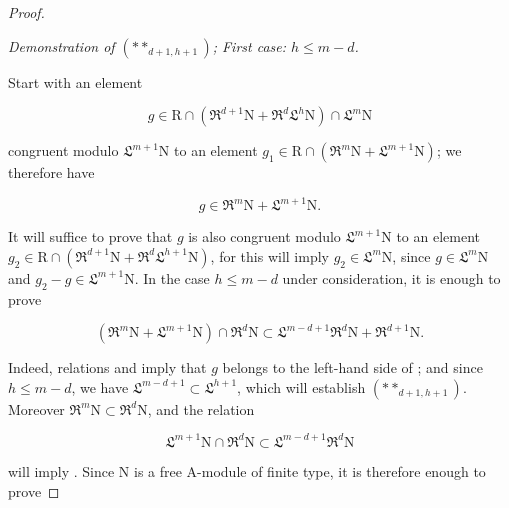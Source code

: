 \begin{proof}
\begin{env}[19.7.1.8]
\label{IV.19.7.1.8}
\emph{Demonstration of $(**_{d+1,h+1})$; First case: $h\leqslant m-d$.}

Start with an element
\end{env}
\begin{env}[19.7.1.9]
\label{IV.19.7.1.9}
\[
  g\in\mathrm{R}\cap(\mathfrak{R}^{d+1}\mathrm{N}+\mathfrak{R}^d\mathfrak{L}^h\mathrm{N})\cap\mathfrak{L}^m\mathrm{N}
\]
\end{env}

congruent modulo $\mathfrak{L}^{m+1}\mathrm{N}$ to an element $g_1\in\mathrm{R}\cap(\mathfrak{R}^m\mathrm{N}+\mathfrak{L}^{m+1}\mathrm{N})$; we therefore have

\begin{env}[19.7.1.10]
\label{IV.19.7.1.10}
\[
  g\in\mathfrak{R}^m\mathrm{N}+\mathfrak{L}^{m+1}\mathrm{N}.
\]
\end{env}

It will suffice to prove that $g$ is also congruent modulo $\mathfrak{L}^{m+1}\mathrm{N}$ to an element $g_2\in\mathrm{R}\cap(\mathfrak{R}^{d+1}\mathrm{N}+\mathfrak{R}^d\mathfrak{L}^{h+1}\mathrm{N})$, for this will imply $g_2\in\mathfrak{L}^m\mathrm{N}$, since $g\in\mathfrak{L}^m\mathrm{N}$ and $g_2-g\in\mathfrak{L}^{m+1}\mathrm{N}$. In the case $h\leqslant m-d$ under consideration, it is enough to prove

\begin{env}[19.7.1.11]
\label{IV.19.7.1.11}
\[
  (\mathfrak{R}^m\mathrm{N}+\mathfrak{L}^{m+1}\mathrm{N})\cap\mathfrak{R}^d\mathrm{N}
  \subset\mathfrak{L}^{m-d+1}\mathfrak{R}^d\mathrm{N}+\mathfrak{R}^{d+1}\mathrm{N}.
\]
\end{env}

Indeed, relations  and  imply that $g$ belongs to the left-hand side of ; and since $h\leqslant m-d$, we have $\mathfrak{L}^{m-d+1}\subset\mathfrak{L}^{h+1}$, which will establish $(**_{d+1,h+1})$. Moreover $\mathfrak{R}^m\mathrm{N}\subset\mathfrak{R}^d\mathrm{N}$, and the relation

\begin{env}[19.7.1.12]
\label{IV.19.7.1.12}
\[
  \mathfrak{L}^{m+1}\mathrm{N}\cap\mathfrak{R}^d\mathrm{N}
  \subset\mathfrak{L}^{m-d+1}\mathfrak{R}^d\mathrm{N}
\]
\end{env}

will imply . Since $\mathrm{N}$ is a free $\mathrm{A}$-module of finite type, it is therefore enough to prove


\end{proof}
